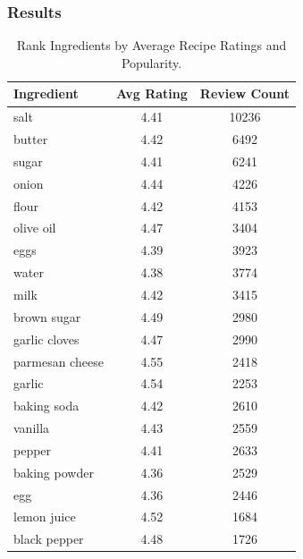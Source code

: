\begin{enumerate}
    \subsubsection{Results}
    \begin{table}[h!]
\small %
\centering
\begin{tabularx}{\textwidth}{>{\raggedright\arraybackslash}Xcc}
\toprule
\textbf{Ingredient} & \textbf{Avg Rating} & \textbf{Review Count} \\
\midrule
salt               & 4.41 & 10236 \\
butter             & 4.42 & 6492 \\
sugar              & 4.41 & 6241 \\
onion              & 4.44 & 4226 \\
flour              & 4.42 & 4153 \\
olive oil          & 4.47 & 3404 \\
eggs               & 4.39 & 3923 \\
water              & 4.38 & 3774 \\
milk               & 4.42 & 3415 \\
brown sugar        & 4.49 & 2980 \\
garlic cloves      & 4.47 & 2990 \\
parmesan cheese    & 4.55 & 2418 \\
garlic             & 4.54 & 2253 \\
baking soda        & 4.42 & 2610 \\
vanilla            & 4.43 & 2559 \\
pepper             & 4.41 & 2633 \\
baking powder      & 4.36 & 2529 \\
egg                & 4.36 & 2446 \\
lemon juice        & 4.52 & 1684 \\
black pepper       & 4.48 & 1726 \\
\bottomrule
\end{tabularx}
\caption{Rank Ingredients by Average Recipe Ratings and Popularity.}
\label{tab:ingredient_data}
\end{table}


\end{enumerate}
